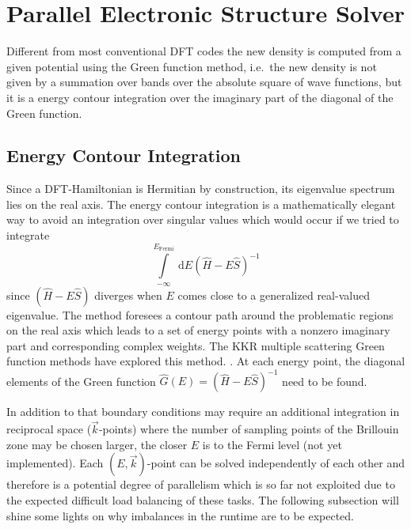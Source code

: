 \documentclass[oribibl]{llncs}
\newcommand{\um}[1]{_{\mathrm{#1}}}
\begin{document}
\newpage

\section{Parallel Electronic Structure Solver}
Different from most conventional \ac{DFT} codes
the new density is computed from a given potential using the Green function method,
i.e.~the new density is not given by a summation over bands over the absolute square of wave functions,
but it is a energy contour integration over the imaginary part of the diagonal of the Green function.

\subsection{Energy Contour Integration}
Since a \ac{DFT}-Hamiltonian is Hermitian by construction, its eigenvalue spectrum lies on the real axis.
The energy contour integration is a mathematically elegant way to avoid an integration over singular values
which would occur if we tried to integrate
\begin{equation}
	\int\limits_{-\infty}^{E\um{Fermi}} \ \mathrm d E (\hat H - E \hat S)^{-1}
\end{equation}
since $(\hat H - E \hat S)$ diverges when $E$ comes close to a generalized real-valued eigenvalue.
The method foresees a contour path around the problematic regions on the real axis
which leads to a set of energy points with a nonzero imaginary part and corresponding complex weights.
The KKR multiple scattering Green function methods have explored this method. 
.
At each energy point, the diagonal elements of the Green function $\hat G(E) = (\hat H - E \hat S)^{-1}$ need to be found.

\noindent
In addition to that boundary conditions may require an additional integration in reciprocal space ($\vec k$-points)
where the number of sampling points of the Brillouin zone may be chosen larger, the closer $E$ is to the Fermi level (not yet implemented).
Each $(E,\vec k)$-point can be solved independently of each other and therefore is a potential degree of parallelism which is so far not exploited due to the expected difficult load balancing of these tasks. The following subsection will shine some lights on why imbalances in the runtime are to be expected.

\end{document}
